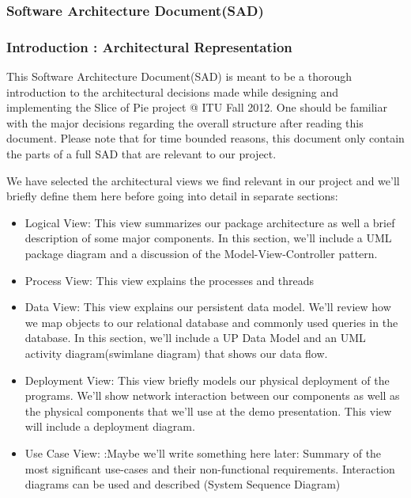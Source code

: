 \subsubsection{Software Architecture Document(SAD)}
\subsubsection{Introduction : Architectural Representation}
This Software Architecture Document(SAD) is meant to be a thorough introduction to the architectural decisions made while designing and implementing the Slice of Pie project @ ITU Fall 2012.
One should be familiar with the major decisions regarding the overall structure after reading this document. Please note that for time bounded reasons, this document only contain the parts of a full SAD that are relevant to our project. 

We have selected the architectural views we find relevant in our project and we'll briefly define them here before going into detail in separate sections:
\begin{itemize}
\item Logical View: This view summarizes our package architecture as well a brief description of some major components. In this section, we'll include a UML package diagram and a discussion of the Model-View-Controller pattern.
\item Process View: This view explains the processes and threads
\item Data View: This view explains our persistent data model. We'll review how we map objects to our relational database and commonly used queries in the database. In this section, we'll include a UP Data Model and an UML activity diagram(swimlane diagram) that shows our data flow.
\item Deployment View: This view briefly models our physical deployment of the programs. We'll show network interaction between our components as well as the physical components that we'll use at the demo presentation. This view will include a deployment diagram.
\item Use Case View: :Maybe we'll write something here later: Summary of the most significant use-cases and their non-functional requirements. Interaction diagrams can be used and described (System Sequence Diagram)
\end{itemize}

